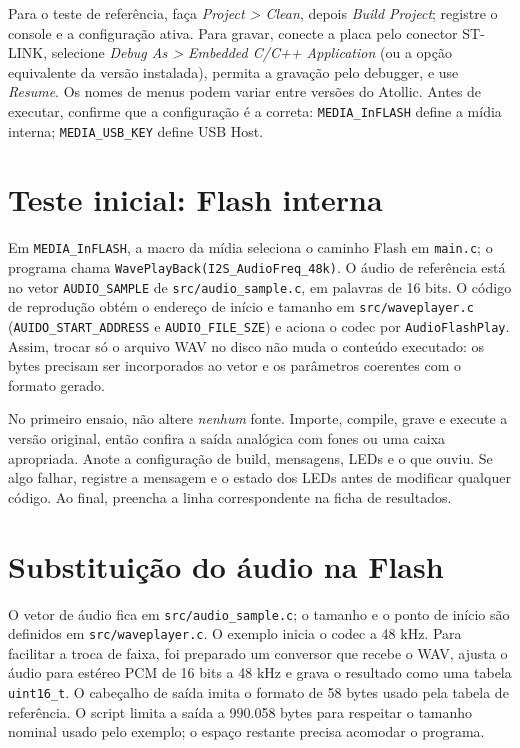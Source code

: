 \documentclass[12pt,journal,compsoc]{IEEEtran}
\begin{document}
Para o teste de referência, faça \textit{Project > Clean}, depois \textit{Build Project}; registre o console e a configuração ativa. Para gravar, conecte a placa pelo conector ST-LINK, selecione \textit{Debug As > Embedded C/C++ Application} (ou a opção equivalente da versão instalada), permita a gravação pelo debugger, e use \textit{Resume}. Os nomes de menus podem variar entre versões do Atollic. Antes de executar, confirme que a configuração é a correta: \texttt{MEDIA\_InFLASH} define a mídia interna; \texttt{MEDIA\_USB\_KEY} define USB Host.

\section{Teste inicial: Flash interna}
Em \texttt{MEDIA\_InFLASH}, a macro da mídia seleciona o caminho Flash em \texttt{main.c}; o programa chama \texttt{WavePlayBack(I2S\_AudioFreq\_48k)}. O áudio de referência está no vetor \texttt{AUDIO\_SAMPLE} de \texttt{src/audio\_sample.c}, em palavras de 16 bits. O código de reprodução obtém o endereço de início e tamanho em \texttt{src/waveplayer.c} (\texttt{AUIDO\_START\_ADDRESS} e \texttt{AUDIO\_FILE\_SZE}) e aciona o codec por \texttt{AudioFlashPlay}. Assim, trocar só o arquivo WAV no disco não muda o conteúdo executado: os bytes precisam ser incorporados ao vetor e os parâmetros coerentes com o formato gerado.

No primeiro ensaio, não altere \emph{nenhum} fonte. Importe, compile, grave e execute a versão original, então confira a saída analógica com fones ou uma caixa apropriada. Anote a configuração de build, mensagens, LEDs e o que ouviu. Se algo falhar, registre a mensagem e o estado dos LEDs antes de modificar qualquer código. Ao final, preencha a linha correspondente na ficha de resultados.

\section{Substituição do áudio na Flash}
O vetor de áudio fica em \texttt{src/audio\_sample.c}; o tamanho e o ponto de início são definidos em \texttt{src/waveplayer.c}. O exemplo inicia o codec a 48 kHz. Para facilitar a troca de faixa, foi preparado um conversor que recebe o WAV, ajusta o áudio para estéreo PCM de 16 bits a 48 kHz e grava o resultado como uma tabela \texttt{uint16\_t}. O cabeçalho de saída imita o formato de 58 bytes usado pela tabela de referência. O script limita a saída a 990.058 bytes para respeitar o tamanho nominal usado pelo exemplo; o espaço restante precisa acomodar o programa.
\end{document}
